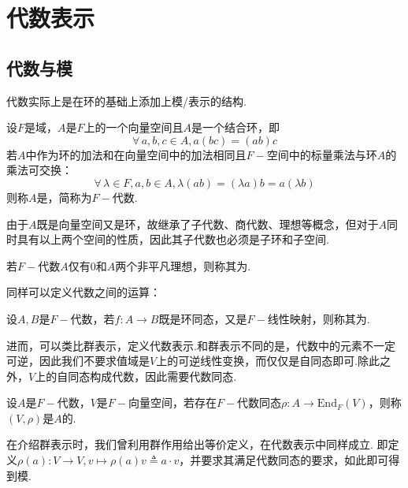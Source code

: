 \chapter{代数表示}

\section{代数与模}

代数实际上是在环的基础上添加上模/表示的结构.

\begin{definition}[域上的代数]
    设$F$是域，$A$是$F$上的一个向量空间且$A$是一个结合环，即
    \[ \forall\, a, b, c \in A, a(bc) = (ab)c \]
    若$A$中作为环的加法和在向量空间中的加法相同且$F-\!\!$空间中的标量乘法与环$A$的乘法可交换：
    \[ \forall\, \lambda \in F, a, b \in A, \lambda(ab) = (\lambda a)b = a(\lambda b) \]
    则称$A$是，简称为$F-\!\!$代数.
\end{definition}

由于$A$既是向量空间又是环，故继承了子代数、商代数、理想等概念，但对于$A$同时具有以上两个空间的性质，因此其子代数也必须是子环和子空间.

\begin{definition}[单代数]
    若$F-\!\!$代数$A$仅有$0$和$A$两个非平凡理想，则称其为.
\end{definition}

同样可以定义代数之间的运算：

\begin{definition}[代数同态]
    设$A, B$是$F-\!\!$代数，若$f: A \to B$既是环同态，又是$F-\!\!$线性映射，则称其为.
\end{definition}

进而，可以类比群表示，定义代数表示.和群表示不同的是，代数中的元素不一定可逆，因此我们不要求值域是$V$上的可逆线性变换，而仅仅是自同态即可.除此之外，$V$上的自同态构成代数，因此需要代数同态.

\begin{definition}[代数的表示]
    设$A$是$F-\!\!$代数，$V$是$F-\!\!$向量空间，若存在$F-\!\!$代数同态$\rho : A \to \mathrm{End}_F(V)$，则称$(V, \rho)$是$A$的.
\end{definition}

在介绍群表示时，我们曾利用群作用给出等价定义，在代数表示中同样成立.
即定义$\rho(a): V \to V, v \mapsto \rho(a)v \triangleq a \cdot v$，并要求其满足代数同态的要求，如此即可得到模.

